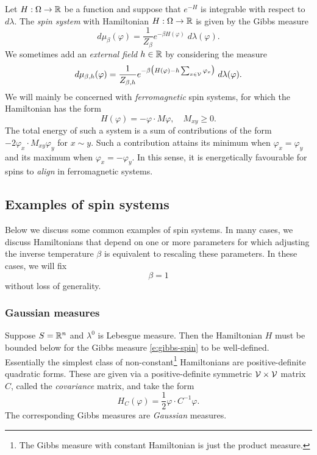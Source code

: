 Let $H : \Omega \rightarrow {\mathbb R}$ be a function and suppose
that $e^{-H}$ is integrable with respect to $d\lambda$.
The \emph{spin system} with Hamiltonian $H : \Omega \rightarrow {\mathbb R}$ is given
by the Gibbs measure
\begin{equation}
\label{e:gibbs-spin}
d\mu_\beta(\varphi)
	=
\frac{1}{Z_\beta} e^{-\beta H(\varphi)} \; d\lambda(\varphi).
\end{equation}
We sometimes add an \emph{external field} $h \in {\mathbb R}$ by considering the measure
\begin{equation}
\label{e:gibbs-spin-ext}
d\mu_{\beta,h}(\varphi)
	=
\frac{1}{Z_{\beta,h}}
e^{-\beta \big(H(\varphi) - h \sum_{x\in\mathcal{V}} \varphi_x\big)} \; d\lambda(\varphi).
\end{equation}
We will mainly be concerned with \emph{ferromagnetic} spin systems, for which the
Hamiltonian has the form
\begin{equation}
H(\varphi) = -\varphi \cdot M\varphi,
	\quad
M_{xy} \ge 0.
\end{equation}
The total energy of such a system is a sum of contributions
of the form $-2 \varphi_x \cdot M_{xy} \varphi_y$ for $x \sim y$. Such a
contribution
attains its minimum when $\varphi_x = \varphi_y$ and its maximum when
$\varphi_x = -\varphi_y$. In this sense, it is energetically favourable
for spins to \emph{align} in ferromagnetic systems.


\subsection{Examples of spin systems}

Below we discuss some common examples of spin systems.
In many cases, we discuss Hamiltonians that depend on one or more parameters
for which adjusting the inverse temperature $\beta$ is equivalent to rescaling
these parameters. In these cases, we will fix
\begin{equation}
\label{e:beta-one}
\beta = 1
\end{equation}
without loss of generality.

\subsubsection{Gaussian measures}

Suppose $S = {\mathbb R}^n$ and $\lambda^0$ is Lebesgue measure. Then the Hamiltonian
$H$ must be bounded below for the Gibbs measure \eqref{e:gibbs-spin} to be
well-defined. Essentially the simplest class of
non-constant\footnote{The Gibbs measure with constant Hamiltonian is just the
product measure.} Hamiltonians
are positive-definite quadratic forms. These are given via a positive-definite
symmetric $\mathcal{V}\times\mathcal{V}$ matrix $C$, called the \emph{covariance}
matrix, and take the form
\begin{equation}
H_C(\varphi) = \frac{1}{2} \varphi \cdot C^{-1} \varphi.
\end{equation}
The corresponding Gibbs measures are \emph{Gaussian} measures.

